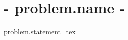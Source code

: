 \documentclass[11pt]{article}
\begin{document}
\section*{ {{- problem.name -}} }

\begin{problems}

    \item[] %

{{ problem.statement_tex }} %

\end{problems}
\end{document}
